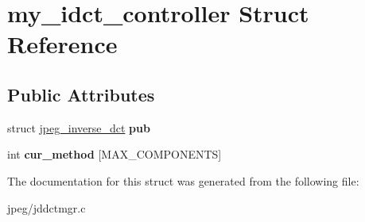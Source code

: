 \hypertarget{structmy__idct__controller}{}\section{my\+\_\+idct\+\_\+controller Struct Reference}
\label{structmy__idct__controller}
\subsection*{Public Attributes}
\begin{DoxyCompactItemize}
\item 
struct \hyperlink{structjpeg__inverse__dct}{jpeg\+\_\+inverse\+\_\+dct} {\bfseries pub}\hypertarget{structmy__idct__controller_ace0aef71b868fc10da51a4be6f8b56ca}{}\label{structmy__idct__controller_ace0aef71b868fc10da51a4be6f8b56ca}

\item 
int {\bfseries cur\+\_\+method} \mbox{[}M\+A\+X\+\_\+\+C\+O\+M\+P\+O\+N\+E\+N\+TS\mbox{]}\hypertarget{structmy__idct__controller_ac13e3955a30c7b2a75c835dc803182cb}{}\label{structmy__idct__controller_ac13e3955a30c7b2a75c835dc803182cb}

\end{DoxyCompactItemize}


The documentation for this struct was generated from the following file\+:\begin{DoxyCompactItemize}
\item 
jpeg/jddctmgr.\+c\end{DoxyCompactItemize}
